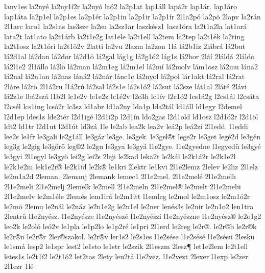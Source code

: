 {lany1es
la2ny^^e9
la2ny1^^ed2r
la2ny^^f3
la^^f32
la2p1at
lap1^^e1ll
lap^^e12r
lap1^^e1r.
lap1^^e1ro
lap1^^e1ta
la2p1el
la2p1es
la2p1^^e9r
la2p1in
la2p1ir
la2p1^^edr
2l1a2p^^f3
la2p^^f6
2lapv
la2r^^e1n
2l1arc
laro1
la2s1as
las3sze
la2su
la2sz1ar
laszk^^e9sz1
lasz1^^f3ra
la2t1a2la
lat1ar^^e1
lata2t
lat1ato
la2t1^^e1rb
la2t1e2g
lat1ele
la2t1ell
la2tem
la2tep
la2t1^^e9k
la2ting
la2t1osz
la2t1^^f3ri
la2t1^^f62v
2latti
la2vu
2lazm
la2zon
1l^^e1
l^^e12b1iz
2l^^e1br^^e1
l^^e12but
l^^e12d1al
l^^e12dan
l^^e12dor
l^^e12d1^^f6
l^^e12gal
l^^e1g1g
l^^e12g1^^f32
l^^e1g1s
l^^e12hor
2l^^e1^^ed
2l^^e1ld^^e1
2l^^e1ldo
l^^e12l1e2
2l1^^e1llo
l^^e12l^^f6
l^^e12man
l^^e12m1eg
l^^e12m1el
l^^e12m^^ed
l^^e12molv
l^^e1m1osz
l^^e12mu
l^^e1na2
l^^e12nal
l^^e12n1an
l^^e12nas
l^^e1n^^e12
l^^e12n^^e1r
l^^e1nc1c
l^^e12nyol
l^^e12pol
l^^e1r1akt
l^^e12ral
l^^e12rat
2l^^e1re
l^^e12r^^f6
2l1^^e12ru
l1^^e12r^^fa
l^^e12sal
l^^e12s1e
l^^e12s1^^f32
l^^e12sut
l^^e12sze
l^^e1t1al
2l^^e1t^^e9
2l^^e1vi
l^^e12z1e
lb^^e12sz^^e1
l1b2l
lc1e2v
lc1e2z
lc1^^e92v
l2c3h
lc1^^edv
l2c1^^f32
lcs1^^e12g
l2cs1^^e1l
l2cs^^e1ta
l2cs^^e9l
lcs1ing
lcs^^f32r
lc3sz
ld1abr
ld1a2ny
lda1p
lda2t^^e1l
ld1^^e1ll
ld1egy
l2demel
l2d1ep
ldes1s
lde2t^^e9r
l2d1ig^^e9
l2d1i2p
l2d1^^edn
ldo2gas
l2d1old
ld1osz
l2d1^^f32r
l2d1^^f6l
ldt2
ld1tr
l2d1ut
l2d1^^fat
ld3z^^e1
1le
le2ab
lea2k
lea2v
le^^e12p
le^^e12zi
2l1edd.
l1eddi
lee2s
le1fr
le3gali
le2g1^^e1ll
le3g^^e1z
le3ge.
le3gek.
le3gel^^aet
lege2r
le3get
leg^^e92d
le3g^^e9n
leg3g
le2gig
le3g^^f6r^^f6
leg^^ae2
le2gu
le3gya
le3gy^^e1
l1e2gye.
l1e2gyedne
l1egyed^^fc
le3gy^^e9
le3gyi
2l1egyl
le3gy^^f6
lei2g
lei2s
2leji
le2kad
leka2t
le2k^^e1l
le2k1^^e12r
le2k1e2l
le2k1e2m
lek1e2r^^ae
le2k1id
le2k^^ae
le1kri
2lektr
le1kvi
2l1e2lemz
2lelev
le2liz
2l1elz
le2m1a2d
2leman.
2lemanj
2lemank
lemec1
2l1e2mel.
2l1e2mel^^e9
2l1e2melh
2l1e2meli
2l1e2melj
2lemelk
le2mell
2l1e2meln
2l1e2mel^^ae
le2melt
2l1e2mel^^fc
2l1e2melv
le2m1^^e9le
2lem^^e9s
lem1ir^^e1
le2m1itt
l1emleg
le2mol
le2m1osz
le2m1^^f32r
le2m^^f6
2lemu
le2n^^e1l
le2n^^e1z
le2n1e2g
le2n1el
le2ner
len^^e9s3s
le2nir
le2n1o2
len1tra
2lentr^^fc
l1e2ny^^e9sz.
l1e2ny^^e9sze
l1e2ny^^e9sz^^e9
l1e2ny^^e9szi
l1e2ny^^e9szne
l1e2ny^^e9sz^^ae
le2o1g2
leo2k
le2ol^^f3
le^^f32v
le1pla
le1p2lo
le1p2r^^e9
le1pri
2l1erd
le2reg
le2r^^ae.
le2r^^aeb
le2r^^aek
le2r^^aen
le2r^^aer
2ler^^aeszakol.
le2r^^aev
ler1s2
le2s1es
l1e2s^^e9se
l1e2s^^e9s^^e9
l1e2s^^e9s^^fc
2lesk^^fc
le1sm^^e1
lesp2
le1spr
lest2
le1sto
le1str
le2szik
2l1eszm
2lesz^^b6
let1e2lem
le2t1ell
letes1s
le2t1^^ed2
le2t1^^f32
let2tas
2lety
leu2t^^e1
l1e2vez.
l1e2vezt
2lexer
l1exp
le2zer
2l1ezr
1l^^e9
}
